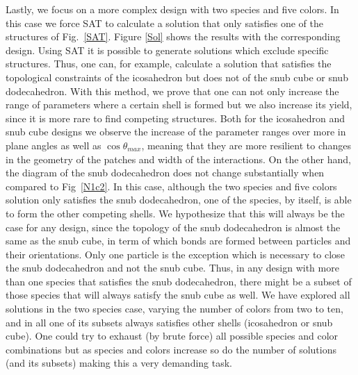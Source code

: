 \documentclass[a4paper, amsfonts, amssymb, amsmath, reprint, showkeys, nofootinbib, twoside]{revtex4-1}
\begin{document}
Lastly, we focus on a more complex design with two species and five colors. In this case we force SAT to calculate a solution that only satisfies one of the structures of Fig.~\ref{SAT}. Figure \ref{Sol} shows the results with the corresponding design. Using SAT it is possible to generate solutions which exclude specific structures. Thus, one can, for example, calculate a solution that satisfies the topological constraints of the icosahedron but does not of the snub cube or snub dodecahedron. With this method, we prove that one can not only increase the range of parameters where a certain shell is formed but we also increase its yield, since it is more rare to find competing structures. Both for the icosahedron and snub cube designs we observe the increase of the parameter ranges over more in plane angles as well as $\cos\theta_{max}$, meaning that they are more resilient to changes in the geometry of the patches and width of the interactions. On the other hand, the diagram of the snub dodecahedron does not change substantially when compared to Fig~\ref{N1c2}. In this case, although the two species and five colors solution only satisfies the snub dodecahedron, one of the species, by itself, is able to form the other competing shells. We hypothesize that this will always be the case for any design, since the topology of the snub dodecahedron is almost the same as the snub cube, in term of which bonds are formed between particles and their orientations. Only one particle is the exception which is necessary to close the snub dodecahedron and not the snub cube. Thus, in any design with more than one species that satisfies the snub dodecahedron, there might be a subset of those species that will always satisfy the snub cube as well. We have explored all solutions in the two species case, varying the number of colors from two to ten, and in all one of its subsets always satisfies other shells (icosahedron or snub cube). One could try to exhaust (by brute force) all possible species and color combinations but as species and colors increase so do the number of solutions (and its subsets) making this a very demanding task.
\end{document}
